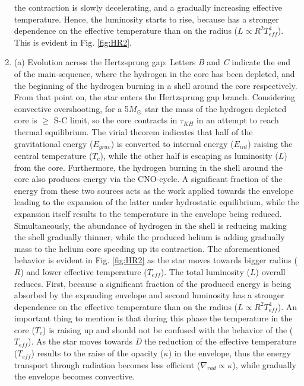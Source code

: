 \documentclass{article}
\newcommand{\msun}{\ensuremath{M_\odot}}
\begin{document}
\begin{enumerate}
the contraction is slowly decelerating, and a gradually increasing effective temperature. Hence, the luminosity starts to rise, because has a stronger dependence on the effective temperature than on the radius ($L \propto R^2 T_{eff}^4$). This is evident in Fig. \ref{fig:HR2}.
    
    \item (a) Evolution across the Hertzsprung gap: Letters {\it B} and {\it C} indicate the end of the main-sequence, where the hydrogen in the core has been depleted, and the beginning of the hydrogen burning in a shell around the core respectively. From that point on, the star enters the Hertzsprung gap branch. Considering convective overshooting, for a 5$\msun$ star the mass of the hydrogen depleted core is $\geq$ S-C limit, so the core contracts in $\tau_{KH}$ in an attempt to reach thermal equilibrium. The virial theorem indicates that half of the gravitational energy ($E_{grav}$) is converted to internal energy ($E_{int}$) raising the central temperature ($T_c$), while the other half is escaping as luminosity ($L$) from the core. Furthermore, the hydrogen burning in the shell around the core also produces energy via the CNO-cycle. A significant fraction of the energy from these two sources acts as the work applied towards the envelope leading to the expansion of the latter under hydrostatic equilibrium, while the expansion itself results to the temperature in the envelope being reduced. Simultaneously, the abundance of hydrogen in the shell is reducing making the shell gradually thinner, while the produced helium is adding gradually mass to the helium core speeding up its contraction. The aforementioned behavior is evident in Fig. \ref{fig:HR2} as the star moves towards bigger radius ($R$) and lower effective temperature ($T_{eff}$). The total luminosity ($L$) overall reduces. First, because a significant fraction of the produced energy is being absorbed by the expanding envelope and second luminosity has a stronger dependence on the effective temperature than on the radius ($L \propto R^2 T_{eff}^4$). An important thing to mention is that during this phase the temperature in the core ($T_c$) is raising up and should not be confused with the behavior of the ($T_{eff}$). As the star moves towards {\it D} the reduction of the effective temperature ($T_{eff}$) results to the raise of the opacity ($\kappa$) in the envelope, thus the energy transport through radiation becomes less efficient ($\nabla_{rad} \propto \kappa$), while gradually the envelope becomes convective.
    

\end{enumerate}
\end{document}
